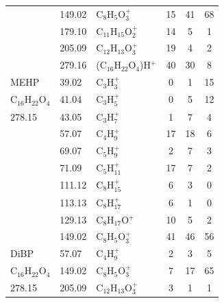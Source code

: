 {\begin{longtable}[c]{lllccc}
                                                         & 149.02 & C$_8$H$_5$O$_3^+$      & 15 & 41 & 68 \\
                                                         & 179.10  & C$_{11}$H$_{15}$O$_2^+$    & 14 & 5  & 1  \\
                                                         & 205.09 & C$_{12}$H$_{13}$O$_3^+$    & 19 & 4  & 2  \\
                                                         & 279.16 & (C$_{16}$H$_{22}$O$_4$)H$^+$ & 40 & 30 & 8 \\
\hline
MEHP                                                     & 39.02  & C$_3$H$_3^+$                   & 0  & 1  & 15 \\
C$_{16}$H$_{22}$O$_4$ & 41.04  & C$_3$H$_5^+$                   & 0  & 5  & 12 \\
278.15                                                   & 43.05  & C$_3$H$_7^+$                   & 1  & 7  & 4  \\
                                                         & 57.07  & C$_4$H$_9^+$                   & 17 & 18 & 6  \\
                                                         & 69.07  & C$_5$H$_9^+$                   & 2  & 7  & 3  \\
                                                         & 71.09  & C$_5$H$_{11}^+$                  & 17 & 7  & 2  \\
                                                         & 111.12 & C$_8$H$_{15}^+$                  & 6  & 3  & 0  \\
                                                         & 113.13 & C$_8$H$_{17}^+$                  & 6  & 1  & 0  \\
                                                         & 129.13 & C$_8$H$_{17}$O$^+$                 & 10 & 5  & 2  \\
                                                         & 149.02 & C$_8$H$_5$O$_3^+$ & 41 & 46 & 56 \\
\hline
DiBP      & 57.07                & C$_4$H$_9^+$                           & 2            & 3            & 5            \\
C$_{16}$H$_{22}$O$_4$          & 149.02               & C$_8$H$_5$O$_3^+$      & 7            & 17           & 65           \\
278.15          & 205.09               & C$_{12}$H$_{13}$O$_3^+$    & 3            & 1            & 1            \\

\end{longtable}}
